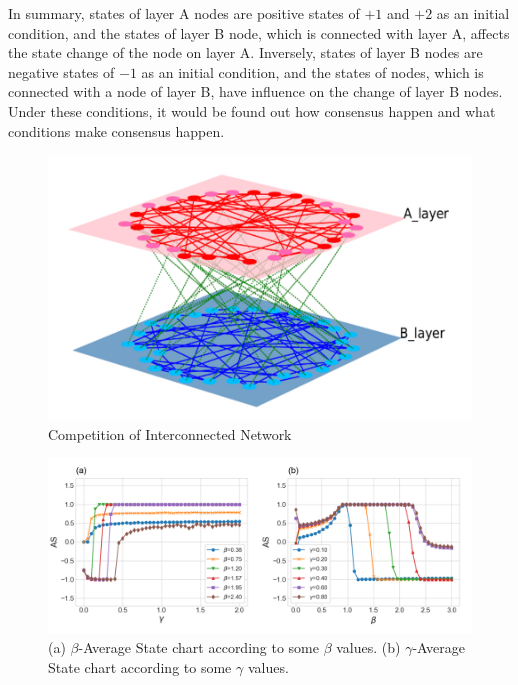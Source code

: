 \documentclass[english]{cccconf}
\begin{document}
In summary, states of layer A nodes are positive states of $+1$ and $+2$ as an initial condition, and the states of layer B node, which is connected with layer A, affects the state change of the node on layer A. Inversely, states of layer B nodes are negative states of $-1$ as an initial condition, and the states of nodes, which is connected with a node of layer B, have influence on the change of layer B nodes. Under these conditions, it would be found out how consensus happen and what conditions make consensus happen.\\
\begin{figure}[!htb]
  \centering
  \includegraphics[width=\hsize]{FIG1.png}
  \caption{Competition of Interconnected Network}
  \label{Fig1}
\end{figure}
\begin{figure}[!htb]
  \centering
  \includegraphics[width=\hsize]{FIG2.png}
  \caption{(a) $\beta$-Average State chart according to some $\beta$ values. (b) $\gamma$-Average State chart according to some $\gamma$ values.}
  \label{Fig2}
\end{figure}
\end{document}
